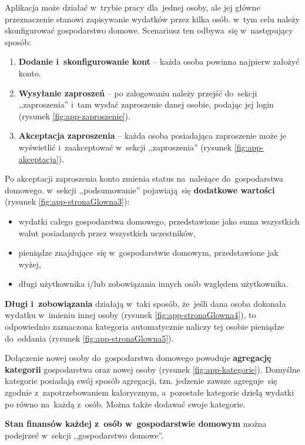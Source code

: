 \documentclass[12pt,a4paper,twoside,titlepage,openright]{book}
\begin{document}
Aplikacja może działać w~trybie pracy dla~jednej osoby, ale jej główne przeznaczenie stanowi zapisywanie wydatków przez kilka osób. w~tym celu należy skonfigurować gospodarstwo domowe. Scenariusz ten odbywa~się w~następujący sposób:

\begin{enumerate}
\item \textbf{Dodanie i~skonfigurowanie kont} -- każda osoba powinna najpierw założyć konto.
\item \textbf{Wysyłanie zaproszeń} -- po zalogowaniu należy przejść do~sekcji ,,zaproszenia'' i~tam wysłać zaproszenie danej osobie, podając jej login (rysunek \ref{fig:app-zaproszenie}).
\item \textbf{Akceptacja zaproszenia} -- każda osoba posiadająca zaproszenie może je wyświetlić i~zaakceptować w~sekcji ,,zaproszenia'' (rysunek \ref{fig:app-akceptacja}).  
\end{enumerate}

Po akceptacji zaproszenia konto zmienia status na~należące do~gospodarstwa domowego. w~sekcji ,,podsumowanie'' pojawiają~się \textbf{dodatkowe wartości} (rysunek \ref{fig:app-stronaGlowna3}):

\begin{itemize}
\item wydatki całego gospodarstwa domowego, przedstawione jako suma wszystkich walut posiadanych przez wszystkich uczestników,
\item pieniądze znajdujące~się w~gospodarstwie domowym, przedstawione jak wyżej,
\item długi użytkownika i/lub zobowiązania innych osób względem użytkownika.
\end{itemize}

\textbf{Długi i~zobowiązania} działają w~taki sposób, że~jeśli dana osoba dokonała wydatku w~imieniu innej osoby (rysunek \ref{fig:app-stronaGlowna4}), to odpowiednio zaznaczona kategoria automatycznie naliczy tej osobie pieniądze do~oddania (rysunek \ref{fig:app-stronaGlowna5}).

Dołączenie nowej osoby do~gospodarstwa domowego powoduje \textbf{agregację kategorii} gospodarstwa oraz nowej osoby (rysunek \ref{fig:app-kategorie}). Domyślne kategorie posiadają swój sposób agregacji, tzn. jedzenie zawsze agreguje~się zgodnie z~zapotrzebowaniem kalorycznym, a~pozostałe kategorie dzielą wydatki po równo na~każdą z~osób. Można także dodawać swoje kategorie.

\textbf{Stan finansów każdej z~osób w~gospodarstwie domowym} można podejrzeć w~sekcji ,,gospodarstwo domowe''. %
\end{document}

